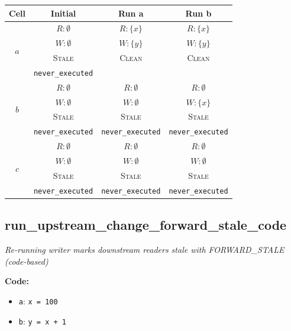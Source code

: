 \documentclass{article}
\begin{document}
\begin{center}
\small
\begin{tabular}{|c|c|c|c|}
\hline
\textbf{Cell} & \textbf{Initial} & \textbf{Run a} & \textbf{Run b} \\
\hline
\multirow{4}{*}{$a$}
  & $R: \emptyset$ & $R: \{x\}$ & $R: \{x\}$ \\
  & $W: \emptyset$ & $W: \{y\}$ & $W: \{y\}$ \\
  & \textsc{Stale} & \textsc{Clean} & \textsc{Clean} \\
  & \footnotesize\texttt{never\_executed} &  &  \\
\hline
\multirow{4}{*}{$b$}
  & $R: \emptyset$ & $R: \emptyset$ & $R: \emptyset$ \\
  & $W: \emptyset$ & $W: \emptyset$ & $W: \{x\}$ \\
  & \textsc{Stale} & \textsc{Stale} & \textsc{Stale} \\
  & \footnotesize\texttt{never\_executed} & \footnotesize\texttt{never\_executed} & \footnotesize\texttt{never\_executed} \\
\hline
\multirow{4}{*}{$c$}
  & $R: \emptyset$ & $R: \emptyset$ & $R: \emptyset$ \\
  & $W: \emptyset$ & $W: \emptyset$ & $W: \emptyset$ \\
  & \textsc{Stale} & \textsc{Stale} & \textsc{Stale} \\
  & \footnotesize\texttt{never\_executed} & \footnotesize\texttt{never\_executed} & \footnotesize\texttt{never\_executed} \\
\hline
\end{tabular}
\end{center}


\subsection{run\_upstream\_change\_forward\_stale\_code}
\textit{Re-running writer marks downstream readers stale with FORWARD\_STALE (code-based)}

\textbf{Code:}
\begin{itemize}
  \item \texttt{a}: \verb|x = 100|
  \item \texttt{b}: \verb|y = x + 1|
\end{itemize}
\end{document}
